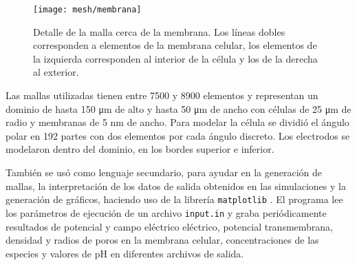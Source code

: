 \begin{figure}
	\texttt{[image: mesh/membrana]}
	\caption{Detalle de la malla cerca de la membrana. Los líneas dobles corresponden a elementos de la membrana celular, los elementos de la izquierda corresponden al interior de la célula y los de la derecha al exterior.}
	\label{fig:mesh-membrana}
\end{figure}


Las mallas utilizadas tienen entre 7500 y 8900 elementos y representan un dominio de hasta 150 \si{\micro\metre} de alto y hasta 50 \si{\micro\metre} de ancho con células de 25 \si{\micro\metre} de radio y membranas de 5 \si{\nano\metre} de ancho. Para modelar la célula se dividió el ángulo polar en 192 partes con dos elementos por cada ángulo discreto. Los electrodos se modelaron dentro del dominio, en los bordes superior e inferior.

También se usó  como lenguaje secundario, para ayudar en la generación de mallas, la interpretación de los datos de salida obtenidos en las simulaciones y la generación de gráficos, haciendo uso de la librería \texttt{matplotlib} \cite{matplotlib}. El programa lee los parámetros de ejecución de un archivo \texttt{input.in} y graba periódicamente resultados de potencial y campo eléctrico eléctrico, potencial transmembrana, densidad y radios de poros en la membrana celular, concentraciones de las especies y valores de pH en diferentes archivos de salida.
